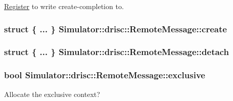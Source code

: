 \hyperlink{class_simulator_1_1_register}{Register} to write create-\/completion to. \hypertarget{struct_simulator_1_1drisc_1_1_remote_message_a635aa879fb98a022efdd9fe4c484c649}{
\subsubsection[{create}]{\setlength{\rightskip}{0pt plus 5cm}struct \{ ... \}   Simulator\+::drisc\+::\+Remote\+Message\+::create}}\label{struct_simulator_1_1drisc_1_1_remote_message_a635aa879fb98a022efdd9fe4c484c649}
\hypertarget{struct_simulator_1_1drisc_1_1_remote_message_af9cc8012c879c68781a40b76d9498d48}{
\subsubsection[{detach}]{\setlength{\rightskip}{0pt plus 5cm}struct \{ ... \}   Simulator\+::drisc\+::\+Remote\+Message\+::detach}}\label{struct_simulator_1_1drisc_1_1_remote_message_af9cc8012c879c68781a40b76d9498d48}
\hypertarget{struct_simulator_1_1drisc_1_1_remote_message_a2cf06cb16814e2e30416e415e2b83290}{
\subsubsection[{exclusive}]{\setlength{\rightskip}{0pt plus 5cm}bool Simulator\+::drisc\+::\+Remote\+Message\+::exclusive}}\label{struct_simulator_1_1drisc_1_1_remote_message_a2cf06cb16814e2e30416e415e2b83290}


Allocate the exclusive context? 


